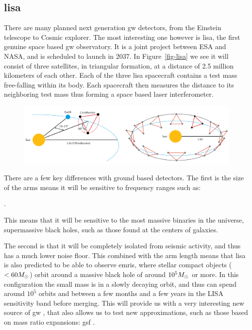\documentclass[
  11pt,
  a4paper,
  DIV=11,
  numbers=noendperiod,
  oneside]{scrreprt}
\let\[\relax \let\]\relax %
\DeclareRobustCommand{\[}{\begin{equation}}
\DeclareRobustCommand{\]}{\end{equation}}
\begin{document}
\hypertarget{lisa}{%
\subsection{\texorpdfstring{\gls{lisa}}{}}\label{lisa}}

There are many planned next generation \gls{gw} detectors, from the
Einstein telescope to Cosmic explorer. The most interesting one however
is \gls{lisa}, the first genuine space based \gls{gw} observatory. It is
a joint project between ESA and NASA, and is scheduled to launch in
2037. In Figure~\ref{fig-lisa} we see it will consist of three
satellites, in triangular formation, at a distance of 2.5 million
kilometers of each other. Each of the three \gls{lisa} spacecraft
contains a test mass free-falling within its body. Each spacecraft then
measures the distance to its neighboring test mass thus forming a space
based laser interferometer.

\begin{figure}


{\centering \includegraphics{./lisatrans.png}

}

\end{figure}

There are a few key differences with ground based detectors. The first
is the size of the arms means it will be sensitive to frequency ranges
such as:

\[
.
\]

This means that it will be sensitive to the most massive binaries in the
universe, supermassive black holes, such as those found at the centers
of galaxies.

The second is that it will be completely isolated from seismic activity,
and thus has a much lower noise floor. This combined with the arm length
means that \gls{lisa} is also predicted to be able to observe
\glspl{emri}, where stellar compact objects (\(<60 M_\odot\)) orbit
around a massive black hole of around \(10^5 M_\odot\) or more. In
this configuration the small mass is in a slowly decaying orbit, and
thus can spend around \(10^5\) orbits and between a few months and a few
years in the LISA sensitivity band before merging. This will provide us
with a very interesting new source of \gls{gw} , that also allows us to
test new approximations, such as those based on mass ratio expansions:
\gls{gsf} .
\end{document}

